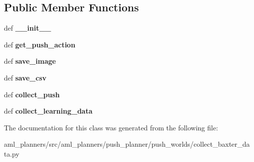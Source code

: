 \subsection*{Public Member Functions}
\begin{DoxyCompactItemize}
\item 
\hypertarget{classaml__planners_1_1push__planner_1_1push__worlds_1_1collect__baxter__data_1_1_collect_baxter_data_aafcc8fdb85419c0f010d0aedd8bf0f58}{def {\bfseries \-\_\-\-\_\-init\-\_\-\-\_\-}}\label{classaml__planners_1_1push__planner_1_1push__worlds_1_1collect__baxter__data_1_1_collect_baxter_data_aafcc8fdb85419c0f010d0aedd8bf0f58}

\item 
\hypertarget{classaml__planners_1_1push__planner_1_1push__worlds_1_1collect__baxter__data_1_1_collect_baxter_data_a60c434775fe7a29163e02838a569e8b1}{def {\bfseries get\-\_\-push\-\_\-action}}\label{classaml__planners_1_1push__planner_1_1push__worlds_1_1collect__baxter__data_1_1_collect_baxter_data_a60c434775fe7a29163e02838a569e8b1}

\item 
\hypertarget{classaml__planners_1_1push__planner_1_1push__worlds_1_1collect__baxter__data_1_1_collect_baxter_data_a61e11a26cae24a315c2da2e4bae87e46}{def {\bfseries save\-\_\-image}}\label{classaml__planners_1_1push__planner_1_1push__worlds_1_1collect__baxter__data_1_1_collect_baxter_data_a61e11a26cae24a315c2da2e4bae87e46}

\item 
\hypertarget{classaml__planners_1_1push__planner_1_1push__worlds_1_1collect__baxter__data_1_1_collect_baxter_data_af0962f1c3e198e48c91a6c941712bfbe}{def {\bfseries save\-\_\-csv}}\label{classaml__planners_1_1push__planner_1_1push__worlds_1_1collect__baxter__data_1_1_collect_baxter_data_af0962f1c3e198e48c91a6c941712bfbe}

\item 
\hypertarget{classaml__planners_1_1push__planner_1_1push__worlds_1_1collect__baxter__data_1_1_collect_baxter_data_afca7f10f0c1ba3af5b8be429c2eb71ef}{def {\bfseries collect\-\_\-push}}\label{classaml__planners_1_1push__planner_1_1push__worlds_1_1collect__baxter__data_1_1_collect_baxter_data_afca7f10f0c1ba3af5b8be429c2eb71ef}

\item 
\hypertarget{classaml__planners_1_1push__planner_1_1push__worlds_1_1collect__baxter__data_1_1_collect_baxter_data_a8b915c1cdbcb988543988906018f6398}{def {\bfseries collect\-\_\-learning\-\_\-data}}\label{classaml__planners_1_1push__planner_1_1push__worlds_1_1collect__baxter__data_1_1_collect_baxter_data_a8b915c1cdbcb988543988906018f6398}

\end{DoxyCompactItemize}


The documentation for this class was generated from the following file\-:\begin{DoxyCompactItemize}
\item 
aml\-\_\-planners/src/aml\-\_\-planners/push\-\_\-planner/push\-\_\-worlds/collect\-\_\-baxter\-\_\-data.\-py\end{DoxyCompactItemize}
